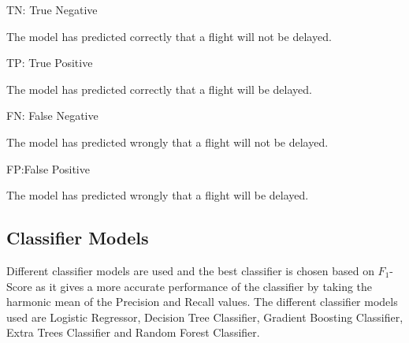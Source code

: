 \documentclass[12pt,letter-paper]{article}
\begin{document}
        \begin{flushleft}
                
                TN: True Negative
                
                The model has predicted correctly that a flight will not be delayed.
                \linebreak
                
                TP: True Positive
                
                The model has predicted correctly that a flight will be delayed.
                \linebreak
                
                FN: False Negative
                
                The model has predicted wrongly that a flight will not be delayed.
                \linebreak
                
                FP:False Positive
                
                The model has predicted wrongly that a flight will be delayed.
                \linebreak
        \end{flushleft}
        
    \subsection{Classifier Models}
    
        Different classifier models are used and the best classifier is chosen based on $F_1$-Score as it gives a more accurate performance of the classifier by taking the harmonic mean of the Precision and Recall values. The different classifier models used are Logistic Regressor, Decision Tree Classifier, Gradient Boosting Classifier, Extra Trees Classifier and Random Forest Classifier.
    
\end{document}
